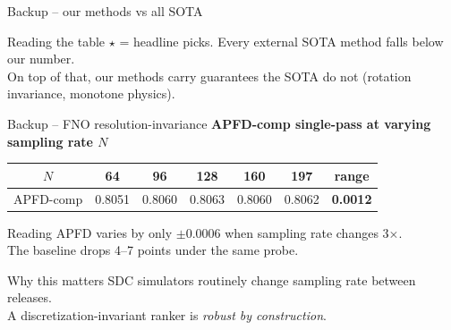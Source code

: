 \documentclass[aspectratio=169,10pt]{beamer}
\begin{document}
\begin{frame}{Backup -- our methods vs all SOTA}
\vspace{0.7em}
\begin{exampleblock}{Reading the table}
\footnotesize
$\star$ = headline picks. Every external SOTA method falls below our number.\\
On top of that, our methods carry guarantees the SOTA do not (rotation invariance, monotone physics).
\end{exampleblock}
\end{frame}

\begin{frame}{Backup -- FNO resolution-invariance}
\centering\scriptsize
\textbf{APFD-comp single-pass at varying sampling rate $N$}\\[0.5em]

\begin{tabular}{c c c c c c c}
  \toprule
  $N$ & 64 & 96 & 128 & 160 & 197 & \textbf{range} \\
  \midrule
  APFD-comp & 0.8051 & 0.8060 & 0.8063 & 0.8060 & 0.8062 & \cellcolor{success!15}\textbf{0.0012} \\
  \bottomrule
\end{tabular}

\vspace{0.8em}
\begin{block}{Reading}
\footnotesize
APFD varies by only $\pm 0.0006$ when sampling rate changes 3$\times$.\\
The baseline drops 4--7 points under the same probe.
\end{block}

\begin{exampleblock}{Why this matters}
\footnotesize
SDC simulators routinely change sampling rate between releases.\\
A discretization-invariant ranker is \emph{robust by construction}.
\end{exampleblock}
\end{frame}
\end{document}
